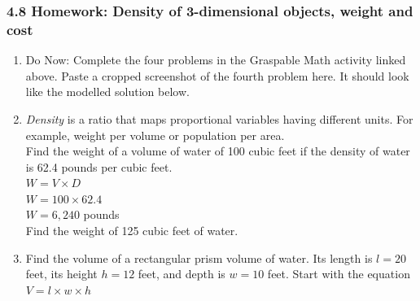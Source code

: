 

\fancyhead[LE]{\thepage}



\subsubsection*{4.8 Homework: Density of 3-dimensional objects, weight and cost}
\begin{enumerate}
\item Do Now: Complete the four problems in the Graspable Math activity linked above. Paste a cropped screenshot of the fourth problem here. It should look like the modelled solution below.

\item \emph{Density} is a ratio that maps proportional variables having different units. For example, weight per volume or population per area. \\[0.5cm]
Find the weight of a volume of water of 100 cubic feet if the density of water is 62.4 pounds per cubic feet.  \\[0.5cm]
$W=V \times D$\\
$W=100 \times 62.4$\\
$W=6,240$ pounds \\[0.5cm]
Find the weight of 125 cubic feet of water.

\item Find the volume of a rectangular prism volume of water. Its length is $l=20$ feet, its height $h=12$ feet, and depth is $w=10$ feet. Start with the equation \\[0.5cm]
$V = l \times w \times h$
  \begin{flushright}
  \end{flushright}


\end{enumerate}
